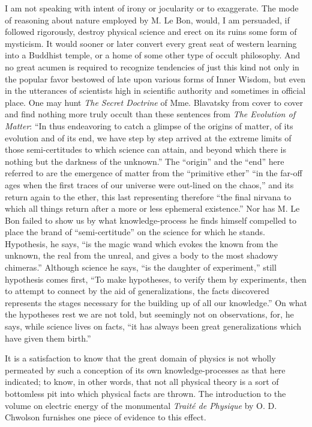 \documentclass[a4paper, 11pt, oneside, polutonikogreek, english, landscape]{article}
\begin{document}
I am not speaking with intent of irony or jocularity or to exaggerate. The mode of reasoning about nature employed by M. Le Bon, would, I am persuaded, if followed rigorously, destroy physical science and erect on its ruins some form of mysticism. It would sooner or later convert every great seat of western learning into a Buddhist temple, or a home of some other type of occult philosophy. And no great acumen is required to recognize tendencies of just this kind not only in the popular favor bestowed of late upon various forms of Inner Wisdom, but even in the utterances of scientists high in scientific authority and sometimes in official place. One may hunt \emph{The Secret Doctrine} of Mme. Blavatsky from cover to cover and find nothing more truly occult than these sentences from \emph{The Evolution of Matter}: ``In thus endeavoring to catch a glimpse of the origins of matter, of its evolution and of its end, we have step by step arrived at the extreme limits of those semi-certitudes to which science can attain, and beyond which there is nothing but the darkness of the unknown.'' The ``origin'' and the ``end'' here referred to are the emergence of matter from the ``primitive ether'' ``in the far-off ages when the first traces of our universe were out-lined on the chaos,'' and its return again to the ether, this last representing therefore ``the final nirvana to which all things return after a more or less ephemeral existence.'' Nor has M. Le Bon failed to show us by what knowledge-process he finds himself compelled to place the brand of ``semi-certitude'' on the science for which he stands. Hypothesis, he says, ``is the magic wand which evokes the known from the unknown, the real from the unreal, and gives a body to the most shadowy chimeras.'' Although science he says, ``is the daughter of experiment,'' still hypothesis comes first, ``To make hypotheses, to verify them by experiments, then to attempt to connect by the aid of generalizations, the facts discovered represents the stages necessary for the building up of all our knowledge.'' On what the hypotheses rest we are not told, but seemingly not on observations, for, he says, while science lives on facts, ``it has always been great generalizations which have given them birth.''

It is a satisfaction to know that the great domain of physics is not wholly permeated by such a conception of its own knowledge-processes as that here indicated; to know, in other words, that not all physical theory is a sort of bottomless pit into which physical facts are thrown. The introduction to the volume on electric energy of the monumental \emph{Traité de Physique} by O. D. Chwolson furnishes one piece of evidence to this effect.
\end{document}
